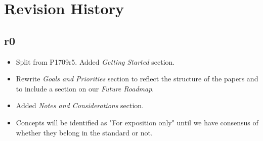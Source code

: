 \section{Revision History}

\subsection*{\paperno r0}

\begin{itemize}
      \item Split from P1709r5. Added \textit{Getting Started} section.
      \item Rewrite \textit{Goals and Priorities} section to reflect the structure of the papers and to include a section on our \textit{Future Roadmap}.
      \item Added \textit{Notes and Considerations} section.
      \item Concepts will be identified as "For exposition only" until we have consensus of whether they belong in the standard or not.
\end{itemize}
